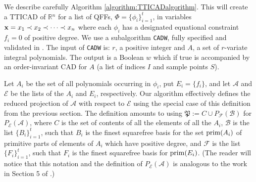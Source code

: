 \documentclass{article}
\def\R {\ensuremath{\mathbb{R}}}
\begin{document}
We describe carefully Algorithm \ref{algorithm:TTICADalgorithm}.  This will create a TTICAD of $\R{}^n$ for a list of QFFs, $\Phi = \{ \phi_i \}_{i=1}^t$, in variables ${\bf x} = x_1 \prec x_2 \prec \cdots \prec x_n$ where each $\phi_i$ has a designated equational constraint $f_i = 0$ of positive degree.  
We use a subalgorithm \texttt{CADW}, fully specified and validated in \cite{McCallum1998}.  The input of {\tt CADW} is: $r$, a positive integer and $A$, a set of $r$-variate integral polynomials. The output is a Boolean $w$ which if true is accompanied by an order-invariant CAD for $A$ (a list of indices $I$ and sample points $S$). 

Let $A_i$ be the set of all polynomials occurring in $\phi_i$,
put $E_i = \{f_i\}$, and let $\mathcal{A}$ and $\mathcal{E}$
be the lists of the $A_i$ and $E_i$, respectively.
Our algorithm effectively defines the reduced projection of $\mathcal{A}$ 
with respect to $\mathcal{E}$ using the special case
of this definition from the previous section. The definition amounts to using 
$ \mathfrak{P} := C \cup P_{\mathcal{F}}(\mathcal{B})$ for $P_{\mathcal{E}}(\mathcal{A})$,
where $C$ is the set of contents of all the elements of all the $A_i$,
$\mathcal{B}$ is the list 
$\{B_i\}_{i=1}^t$, such that $B_i$ is the finest squarefree
basis for the set ${\rm prim}(A_i)$
of primitive parts of elements of $A_i$ which have 
positive degree, and $\mathcal{F}$ is the list
$\{F_i\}_{i=1}^t$, such that $F_i$ is the finest squarefree basis
for ${\rm prim}(E_i)$. (The reader will notice that this notation and the 
definition of $P_{\mathcal{E}}(\mathcal{A})$ is analogous to the work in Section 5 of \cite{McCallum1999a}.)
\end{document}
